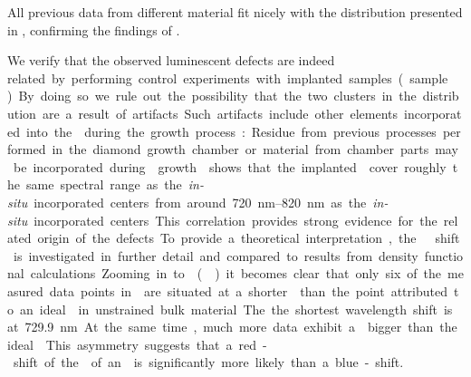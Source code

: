 	All previous data from different \nd material fit nicely with the \ZPL distribution presented in , confirming the findings of .
	
		We verify that the observed luminescent defects are indeed \si related by performing control experiments with \si implanted samples (sample \implantedTao).
	By doing so we rule out the possibility that the two clusters in the distribution are a result of artifacts.
	Such artifacts include other elements incorporated into the \nds during the growth process: Residue from previous processes performed in the diamond growth chamber or material from chamber parts may be incorporated during \nd growth.
	 shows that the implanted \sivs cover roughly the same spectral range as the \textit{in-situ} incorporated centers from around \SIrange{720}{820}{nm} as the \textit{in-situ} incorporated centers.
	This correlation provides strong evidence for the \si related origin of the defects.
	
	To provide a theoretical interpretation, the \ZPL \cwl shift is investigated in further detail and compared to results from density functional calculations.
	Zooming in to \vl () it becomes clear that only six of the measured data points in \vl are situated at a shorter \cwl than the point attributed to an ideal \siv in unstrained bulk material.
	The the shortest wavelength shift is at \SI{729.9}{nm}.
	At the same time, much more data exhibit a \cwl bigger than the ideal \siv.
	This asymmetry suggests that a red-shift of the \ZPL of an \siv is significantly more likely than a blue-shift.

